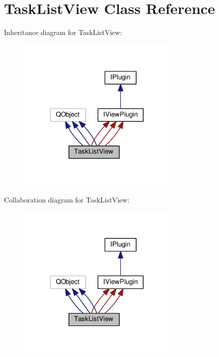 \hypertarget{class_task_list_view}{}\section{Task\+List\+View Class Reference}
\label{class_task_list_view}


Inheritance diagram for Task\+List\+View\+:\nopagebreak
\begin{figure}[H]
\begin{center}
\leavevmode
\includegraphics[width=219pt]{class_task_list_view__inherit__graph}
\end{center}
\end{figure}


Collaboration diagram for Task\+List\+View\+:\nopagebreak
\begin{figure}[H]
\begin{center}
\leavevmode
\includegraphics[width=219pt]{class_task_list_view__coll__graph}
\end{center}
\end{figure}
